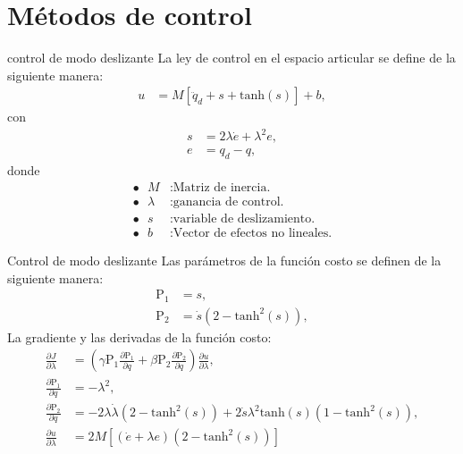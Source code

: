 \documentclass[10pt]{beamer} %
\begin{document}
	

	
	\section{Métodos de control}

	\begin{frame}[fragile]{control de modo deslizante}	
	La ley de control en el espacio articular se define de la siguiente manera:
	\begin{align*}
		u &= M \left[\ddot{q}_d + s + \mathrm{tanh}(s) \right] + b,
	\end{align*}
	con
	\begin{align*}
		s &= 2 \lambda \dot{e} + \lambda^2 e, \\
		e &= q_d - q,
	\end{align*} 
	donde
		\begin{align*}
			\bullet \textrm{ } M&: \textrm{Matriz de inercia.} 			\\
			\bullet \textrm{ } \lambda&: \textrm{ganancia de control.} 	\\
			\bullet \textrm{ } s&: \textrm{variable de deslizamiento.} 	\\
			\bullet \textrm{ } b&: \textrm{Vector de efectos no lineales.}							
		\end{align*}
	\end{frame}	
	
	\begin{frame}[fragile]{Control de modo deslizante}	
		Las parámetros de la función costo se definen de la siguiente manera:
		\begin{align*}
			\mathrm{P_1}&= s, \\
			\mathrm{P_2}&= \dot{s}(2 - \mathrm{tanh}^2(s)),
		\end{align*}
		La gradiente y las derivadas de la función costo:
		\begin{align*}
			 \frac{\partial J}{\partial \lambda} &= \left(\gamma \mathrm{P_1} \frac{\partial \mathrm{P_1}}{\partial q} + \beta \mathrm{P_2} \frac{\partial \mathrm{P_2}}{\partial q} \right)
			 \frac{\partial u}{\partial \lambda}, \\
			 \frac{\partial \mathrm{P_1}}{\partial q} &= -\lambda^2, \\
			 \frac{\partial \mathrm{P_2}}{\partial q} &= -2\lambda\dot{\lambda}(2-\mathrm{tanh}^2(s)) + 2\dot{s}\lambda^2 \mathrm{tanh}(s) (1-\mathrm{tanh}^2(s)), \\
			 \frac{\partial u}{\partial \lambda} &= 2M \left[(\dot{e}+\lambda e)(2- \mathrm{tanh}^2(s) ) \right]
		\end{align*}
		
	\end{frame}
\end{document}
